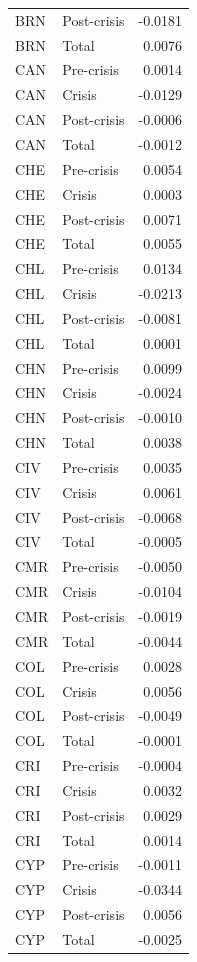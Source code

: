 \begin{longtable}[t]{llr}
BRN & Post-crisis & -0.0181\\
\addlinespace
BRN & Total & 0.0076\\
CAN & Pre-crisis & 0.0014\\
CAN & Crisis & -0.0129\\
CAN & Post-crisis & -0.0006\\
CAN & Total & -0.0012\\
\addlinespace
CHE & Pre-crisis & 0.0054\\
CHE & Crisis & 0.0003\\
CHE & Post-crisis & 0.0071\\
CHE & Total & 0.0055\\
CHL & Pre-crisis & 0.0134\\
\addlinespace
CHL & Crisis & -0.0213\\
CHL & Post-crisis & -0.0081\\
CHL & Total & 0.0001\\
CHN & Pre-crisis & 0.0099\\
CHN & Crisis & -0.0024\\
\addlinespace
CHN & Post-crisis & -0.0010\\
CHN & Total & 0.0038\\
CIV & Pre-crisis & 0.0035\\
CIV & Crisis & 0.0061\\
CIV & Post-crisis & -0.0068\\
\addlinespace
CIV & Total & -0.0005\\
CMR & Pre-crisis & -0.0050\\
CMR & Crisis & -0.0104\\
CMR & Post-crisis & -0.0019\\
CMR & Total & -0.0044\\
\addlinespace
COL & Pre-crisis & 0.0028\\
COL & Crisis & 0.0056\\
COL & Post-crisis & -0.0049\\
COL & Total & -0.0001\\
CRI & Pre-crisis & -0.0004\\
\addlinespace
CRI & Crisis & 0.0032\\
CRI & Post-crisis & 0.0029\\
CRI & Total & 0.0014\\
CYP & Pre-crisis & -0.0011\\
CYP & Crisis & -0.0344\\
\addlinespace
CYP & Post-crisis & 0.0056\\
CYP & Total & -0.0025\\

\end{longtable}
